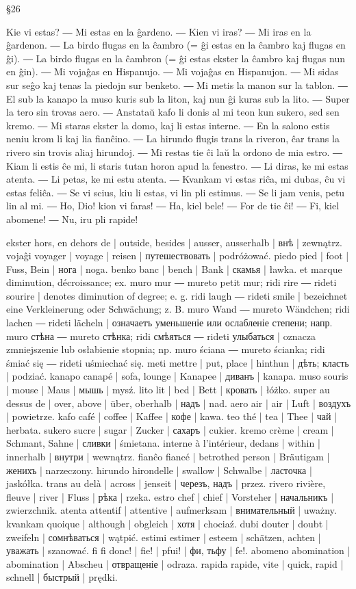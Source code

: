 §26

Kie vi estas? ― Mi estas en la ĝardeno. ― Kien vi iras? ― Mi iras en la ĝardenon. ― La birdo flugas en la ĉambro (= ĝi estas en la ĉambro kaj flugas en ĝi). ― La birdo flugas en la ĉambron (= ĝi estas ekster la ĉambro kaj flugas nun en ĝin). ― Mi vojaĝas en Hispanujo. ― Mi vojaĝas en Hispanujon. ― Mi sidas sur seĝo kaj tenas la piedojn sur benketo. ― Mi metis la manon sur la tablon. ― El sub la kanapo la muso kuris sub la liton, kaj nun ĝi kuras sub la lito. ― Super la tero sin trovas aero. ― Anstataŭ kafo li donis al mi teon kun sukero, sed sen kremo. ― Mi staras ekster la domo, kaj li estas interne. ― En la salono estis neniu krom li kaj lia fianĉino. ― La hirundo flugis trans la riveron, ĉar trans la rivero sin trovis aliaj hirundoj. ― Mi restas tie ĉi laŭ la ordono de mia estro. ― Kiam li estis ĉe mi, li staris tutan horon apud la fenestro. ― Li diras, ke mi estas atenta. ― Li petas, ke mi estu atenta. ― Kvankam vi estas riĉa, mi dubas, ĉu vi estas feliĉa. ― Se vi scius, kiu li estas, vi lin pli estimus. ― Se li jam venis, petu lin al mi. ― Ho, Dio! kion vi faras! ― Ha, kiel bele! ― For de tie ĉi! ― Fi, kiel abomene! ― Nu, iru pli rapide!

ekster hors, en dehors de | outside, besides | ausser, ausserhalb | внѣ | zewnątrz.
vojaĝi voyager | voyage | reisen | путешествовать | podróżować.
piedo pied | foot | Fuss, Bein | нога | noga.
benko banc | bench | Bank | скамья | ławka.
et marque diminution, décroissance; ex. muro mur ― mureto petit mur; ridi rire ― rideti sourire | denotes diminution of degree; e. g. ridi laugh ― rideti smile | bezeichnet eine Verkleinerung oder Schwächung; z. B. muro Wand ― mureto Wändchen; ridi lachen ― rideti lächeln | означаетъ уменьшеніе или ослабленіе степени; напр. muro стѣна ― mureto стѣнка; ridi смѣяться ― rideti улыбаться | oznacza zmniejszenie lub osłabienie stopnia; np. muro ściana ― mureto ścianka; ridi śmiać się ― rideti uśmiechać się.
meti mettre | put, place | hinthun | дѣть; класть | podziać.
kanapo canapé | sofa, lounge | Kanapee | диванъ | kanapa.
muso souris | mouse | Maus | мышь | mysź.
lito lit | bed | Bett | кровать | łóżko.
super au dessus de | over, above | über, oberhalb | надъ | nad.
aero air | air | Luft | воздухъ | powietrze.
kafo café | coffee | Kaffee | кофе | kawa.
teo thé | tea | Thee | чай | herbata.
sukero sucre | sugar | Zucker | сахаръ | cukier.
kremo crème | cream | Schmant, Sahne | сливки | śmietana.
interne à l’intérieur, dedans | within | innerhalb | внутри | wewnątrz.
fianĉo fiancé | betrothed person | Bräutigam | женихъ | narzeczony.
hirundo hirondelle | swallow | Schwalbe | ласточка | jaskółka.
trans au delà | across | jenseit | черезъ, надъ | przez.
rivero rivière, fleuve | river | Fluss | рѣка | rzeka.
estro chef | chief | Vorsteher | начальникъ | zwierzchnik.
atenta attentif | attentive | aufmerksam | внимательный | uważny.
kvankam quoique | although | obgleich | хотя | chociaź.
dubi douter | doubt | zweifeln | сомнѣваться | wątpić.
estimi estimer | esteem | schätzen, achten | уважать | szanować.
fi fi donc! | fie! | pfui! | фи, тьфу | fe!.
abomeno abomination | abomination | Abscheu | отвращеніе | odraza.
rapida rapide, vite | quick, rapid | schnell | быстрый | prędki.

